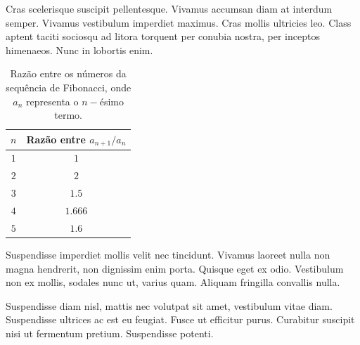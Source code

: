 Cras scelerisque suscipit pellentesque. Vivamus accumsan diam at interdum semper. Vivamus vestibulum imperdiet maximus. Cras mollis ultricies leo. Class aptent taciti sociosqu ad litora torquent per conubia nostra, per inceptos himenaeos. Nunc in lobortis enim.

\begin{table}[h!]
    \centering
    \begin{tabular}{|c|c|}
    \hline
         $n$ & Razão entre $a_{n+1}/a_{n}$  \\
    \hline
        $1$ & $1$\\ 
    \hline
         $2$ &  $2$\\
    \hline
        $3$ & $1.5$\\
    \hline
        $4$ & $1.666$\\
        \hline
        $5$ & $1.6$\\
        \hline
    \end{tabular}
    \caption{Razão entre os números da sequência de Fibonacci, onde $a_n$ representa o $n-$ésimo termo.}
\end{table}

Suspendisse imperdiet mollis velit nec tincidunt. Vivamus laoreet nulla non magna hendrerit, non dignissim enim porta. Quisque eget ex odio. Vestibulum non ex mollis, sodales nunc ut, varius quam. Aliquam fringilla convallis nulla.

 Suspendisse diam nisl, mattis nec volutpat sit amet, vestibulum vitae diam. Suspendisse ultrices ac est eu feugiat. Fusce ut efficitur purus. Curabitur suscipit nisi ut fermentum pretium. Suspendisse potenti.
